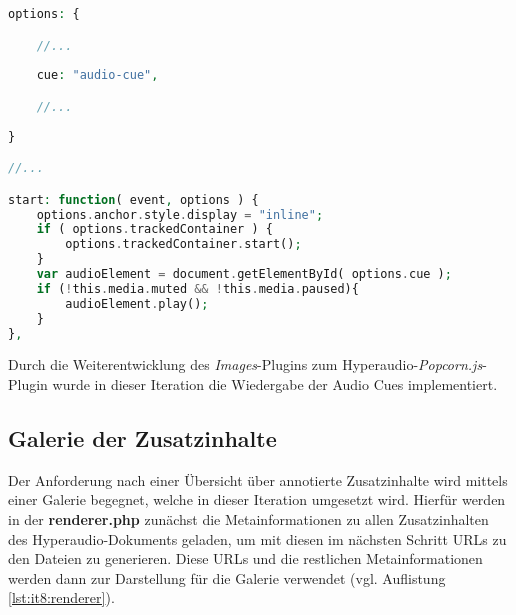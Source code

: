 \begin{lstlisting}[language=php,
             linewidth=\textwidth,
             caption={Ausschnitt der \textbf{popcorn.hyperaudio.js} in der 7. Iteration},
             label={lst:it7:popcorn.hyperaudio}]
options: {

    //...
    
    cue: "audio-cue",

    //...    
    
}

//...

start: function( event, options ) {
    options.anchor.style.display = "inline";
    if ( options.trackedContainer ) {
        options.trackedContainer.start();
    }
    var audioElement = document.getElementById( options.cue );
    if (!this.media.muted && !this.media.paused){
        audioElement.play();
    }
},
\end{lstlisting}

Durch die Weiterentwicklung des \textit{Images}-Plugins zum Hyperaudio-\textit{Popcorn.js}-Plugin wurde in dieser Iteration die Wiedergabe der Audio Cues implementiert.

\subsection{Galerie der Zusatzinhalte}
Der Anforderung nach einer Übersicht über annotierte Zusatzinhalte wird mittels einer Galerie begegnet, welche in dieser Iteration umgesetzt wird. Hierfür werden in der \textbf{renderer.php} zunächst die Metainformationen zu allen Zusatzinhalten des Hyperaudio-Dokuments geladen, um mit diesen im nächsten Schritt URLs zu den Dateien zu generieren. Diese URLs und die restlichen Metainformationen werden dann zur Darstellung für die Galerie verwendet (vgl. Auflistung \ref{lst:it8:renderer}).

